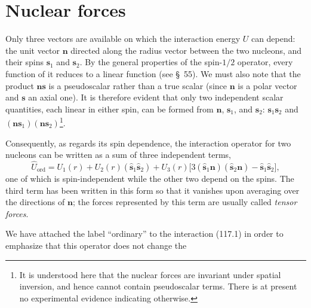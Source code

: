 \section{Nuclear forces}





Only three vectors are available on which the interaction energy $U$ can
depend: the unit vector $\mathbf n$ directed along the radius vector between
the two nucleons, and their spins $\mathbf s_1$ and $\mathbf s_2$. By the
general properties of the spin-$1/2$ operator, every function of it reduces to
a linear function (see §~55). We must also note that the product $\mathbf
n\mathbf s$ is a pseudoscalar rather than a true scalar (since $\mathbf n$ is
a polar vector and $\mathbf s$ an axial one). It is therefore evident that
only two independent scalar quantities, each linear in either spin, can be
formed from $\mathbf n$, $\mathbf s_1$, and $\mathbf s_2$: $\mathbf s_1\mathbf
s_2$ and $(\mathbf n\mathbf s_1)(\mathbf n\mathbf s_2)$\footnote{It is
understood here that the nuclear forces are invariant under spatial inversion,
and hence cannot contain pseudoscalar terms. There is at present no experimental
evidence indicating otherwise.}.

Consequently, as regards its spin dependence, the interaction operator for two
nucleons can be written as a sum of three independent terms,
\begin{equation}
 \hat U_{\text{ord}}=U_1(r)+U_2(r)(\hat{\mathbf s}_1\hat{\mathbf s}_2)
 +U_3(r)\bigl[3(\hat{\mathbf s}_1\mathbf n)
 (\hat{\mathbf s}_2\mathbf n)-\hat{\mathbf s}_1\hat{\mathbf s}_2\bigr],
 \tag{117.1}
\end{equation}
one of which is spin-independent while the other two depend on the spins. The
third term has been written in this form so that it vanishes upon averaging
over the directions of $\mathbf n$; the forces represented by this term are
usually called \emph{tensor forces}.

We have attached the label ``ordinary'' to the interaction (117.1) in order to
emphasize that this operator does not change the

